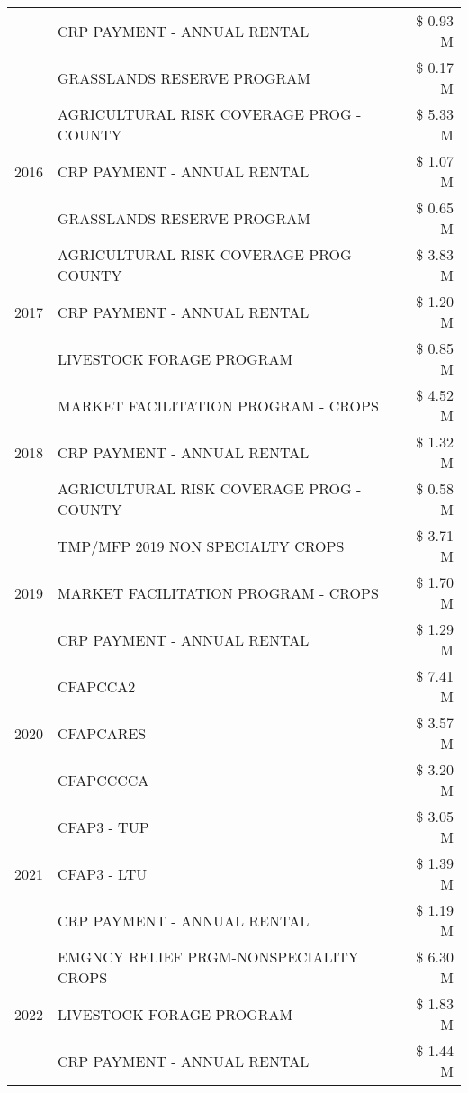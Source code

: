 \begin{tabular}{llr}
 & CRP PAYMENT - ANNUAL RENTAL & \$ 0.93 M \\
 & GRASSLANDS RESERVE PROGRAM & \$ 0.17 M \\
\cline{1-3}
\multirow[t]{3}{*}{2016} & AGRICULTURAL RISK COVERAGE PROG - COUNTY & \$ 5.33 M \\
 & CRP PAYMENT - ANNUAL RENTAL & \$ 1.07 M \\
 & GRASSLANDS RESERVE PROGRAM & \$ 0.65 M \\
\cline{1-3}
\multirow[t]{3}{*}{2017} & AGRICULTURAL RISK COVERAGE PROG - COUNTY & \$ 3.83 M \\
 & CRP PAYMENT - ANNUAL RENTAL & \$ 1.20 M \\
 & LIVESTOCK FORAGE PROGRAM & \$ 0.85 M \\
\cline{1-3}
\multirow[t]{3}{*}{2018} & MARKET FACILITATION PROGRAM - CROPS & \$ 4.52 M \\
 & CRP PAYMENT - ANNUAL RENTAL & \$ 1.32 M \\
 & AGRICULTURAL RISK COVERAGE PROG - COUNTY & \$ 0.58 M \\
\cline{1-3}
\multirow[t]{3}{*}{2019} & TMP/MFP 2019 NON SPECIALTY CROPS & \$ 3.71 M \\
 & MARKET FACILITATION PROGRAM - CROPS & \$ 1.70 M \\
 & CRP PAYMENT - ANNUAL RENTAL & \$ 1.29 M \\
\cline{1-3}
\multirow[t]{3}{*}{2020} & CFAPCCA2 & \$ 7.41 M \\
 & CFAPCARES & \$ 3.57 M \\
 & CFAPCCCCA & \$ 3.20 M \\
\cline{1-3}
\multirow[t]{3}{*}{2021} & CFAP3 - TUP & \$ 3.05 M \\
 & CFAP3 - LTU & \$ 1.39 M \\
 & CRP PAYMENT - ANNUAL RENTAL & \$ 1.19 M \\
\cline{1-3}
\multirow[t]{3}{*}{2022} & EMGNCY RELIEF PRGM-NONSPECIALITY CROPS & \$ 6.30 M \\
 & LIVESTOCK FORAGE PROGRAM & \$ 1.83 M \\
 & CRP PAYMENT - ANNUAL RENTAL & \$ 1.44 M \\
\cline{1-3}
\bottomrule
\end{tabular}
